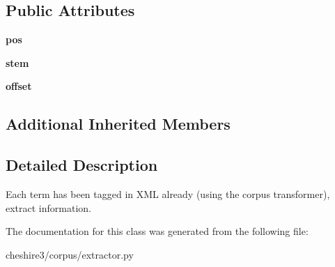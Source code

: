 \subsection*{Public Attributes}
\begin{DoxyCompactItemize}
\item 
\hypertarget{classcheshire3_1_1corpus_1_1extractor_1_1_tagged_term_extractor_a8ed34f0ea9a6e68bd207ddb83ef90ea8}{{\bfseries pos}}\label{classcheshire3_1_1corpus_1_1extractor_1_1_tagged_term_extractor_a8ed34f0ea9a6e68bd207ddb83ef90ea8}

\item 
\hypertarget{classcheshire3_1_1corpus_1_1extractor_1_1_tagged_term_extractor_aeb7351673b9af35cdb8cc9b14db723ca}{{\bfseries stem}}\label{classcheshire3_1_1corpus_1_1extractor_1_1_tagged_term_extractor_aeb7351673b9af35cdb8cc9b14db723ca}

\item 
\hypertarget{classcheshire3_1_1corpus_1_1extractor_1_1_tagged_term_extractor_ac66402e9f8c684fbd1a3aefbb1c572aa}{{\bfseries offset}}\label{classcheshire3_1_1corpus_1_1extractor_1_1_tagged_term_extractor_ac66402e9f8c684fbd1a3aefbb1c572aa}

\end{DoxyCompactItemize}
\subsection*{Additional Inherited Members}


\subsection{Detailed Description}
\begin{DoxyVerb}Each term has been tagged in XML already (using the corpus transformer), extract information.\end{DoxyVerb}
 

The documentation for this class was generated from the following file\-:\begin{DoxyCompactItemize}
\item 
cheshire3/corpus/extractor.\-py\end{DoxyCompactItemize}

